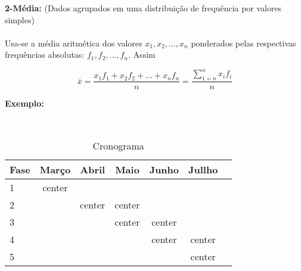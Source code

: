 \documentclass{book}
\begin{document}
\textbf{2-Média:} (Dados agrupados em uma distribuição de frequência por valores simples)\\
\\

Usa-se a média aritmética dos valores $x_1,x_2,...,x_n$ ponderados pelas respectivas frequências absolutas: $f_1,f_2,...,f_n.$ Assim 

$$\bar{x}= \frac{x_1 f_1 + x_2 f_2 + ... + x_n f_n}{n} = \frac{\sum_{1=n}^n{x_i f_i}}{n}$$ 


\textbf{Exemplo:}


\begin{table}[h]
\centering
    \caption{Cronograma} \\

\begin{tabular}{|l||c|c|c|c|c|c|}
\hline 
Fase & Março & Abril & Maio & Junho & Jullho \\
\hline
1    & center &       &        &        &      \\
2    &        & center& center &        &       \\ 
3    &        &       &center  & center &      \\ 
4    &        &       &        & center & center \\
5    &        &       &       &         & center \\
\hline
\hline

\end{tabular} 

\end{table}



\end{document}
